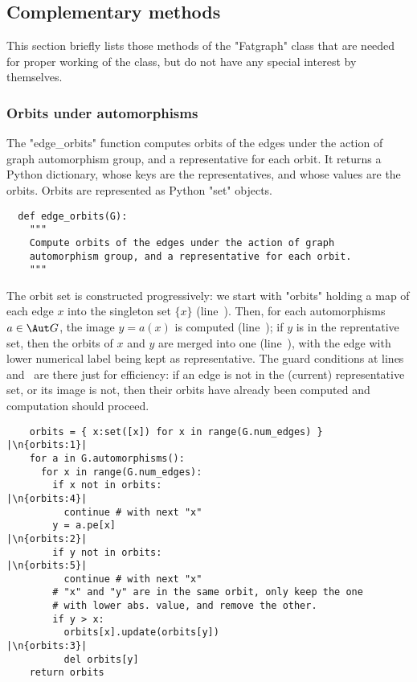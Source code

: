 \subsection{Complementary methods}
\label{sec:complementary}

This section briefly lists those methods of the "Fatgraph" class that
are needed for proper working of the class, but do not have any
special interest by themselves.

\subsubsection{Orbits under automorphisms}
The "edge_orbits" function computes orbits of the edges under the
action of graph automorphism group, and a representative for each
orbit.  It returns a Python dictionary, whose keys are the
representatives, and whose values are the orbits.  Orbits are
represented as Python "set" objects.
\begin{lstlisting}
  def edge_orbits(G):
    """
    Compute orbits of the edges under the action of graph
    automorphism group, and a representative for each orbit.
    """
\end{lstlisting}
The orbit set is constructed progressively: we start with "orbits"
holding a map of each edge $x$ into the singleton set $\{x\}$
(line~). Then, for each automorphisms $a \in \Aut G$,
the image $y = a(x)$ is computed (line~); if $y$ is
in the reprentative set, then the orbits of $x$ and $y$ are merged
into one (line~), with the edge with lower numerical
label being kept as representative.  The guard conditions at
lines~ and~ are there just for efficiency:
if an edge is not in the (current) representative set, or its image is
not, then their orbits have already been computed and computation
should proceed.
\begin{lstlisting}
    orbits = { x:set([x]) for x in range(G.num_edges) }  |\n{orbits:1}|
    for a in G.automorphisms():                          
      for x in range(G.num_edges):
        if x not in orbits:                              |\n{orbits:4}|
          continue # with next "x"
        y = a.pe[x]                                      |\n{orbits:2}|
        if y not in orbits:                              |\n{orbits:5}|
          continue # with next "x"
        # "x" and "y" are in the same orbit, only keep the one
        # with lower abs. value, and remove the other.
        if y > x:
          orbits[x].update(orbits[y])                    |\n{orbits:3}|
          del orbits[y]
    return orbits

\end{lstlisting}


